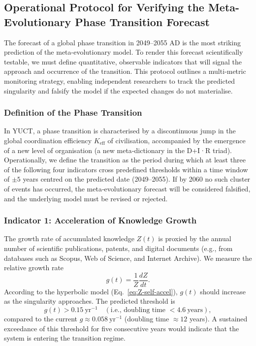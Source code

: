 \documentclass[12pt,a4paper]{article}
\theoremstyle{remark}
\begin{document}
	\subsection{Operational Protocol for Verifying the Meta-Evolutionary Phase Transition Forecast}
	\label{subsec:forecast-protocol}
	
	The forecast of a global phase transition in 2049–2055 AD is the most striking prediction of the meta-evolutionary model. To render this forecast scientifically testable, we must define quantitative, observable indicators that will signal the approach and occurrence of the transition. This protocol outlines a multi‑metric monitoring strategy, enabling independent researchers to track the predicted singularity and falsify the model if the expected changes do not materialise.
	
	\subsubsection{Definition of the Phase Transition}
	
	In YUCT, a phase transition is characterised by a discontinuous jump in the global coordination efficiency \(K_{\text{eff}}\) of civilisation, accompanied by the emergence of a new level of organisation (a new meta‑dictionary in the D+I·R triad). Operationally, we define the transition as the period during which at least three of the following four indicators cross predefined thresholds within a time window of \(\pm 5\) years centred on the predicted date (2049–2055). If by 2060 no such cluster of events has occurred, the meta‑evolutionary forecast will be considered falsified, and the underlying model must be revised or rejected.
	
	\subsubsection{Indicator 1: Acceleration of Knowledge Growth}
	
	The growth rate of accumulated knowledge \(Z(t)\) is proxied by the annual number of scientific publications, patents, and digital documents (e.g., from databases such as Scopus, Web of Science, and Internet Archive). We measure the relative growth rate
	\[
	g(t) = \frac{1}{Z}\frac{dZ}{dt}.
	\]
	According to the hyperbolic model (Eq.~\ref{eq:Z-self-accel}), \(g(t)\) should increase as the singularity approaches. The predicted threshold is
	\[
	g(t) > 0.15\ \text{yr}^{-1} \quad (\text{i.e., doubling time } < 4.6\ \text{years}),
	\]
	compared to the current \(g\approx 0.058\ \text{yr}^{-1}\) (doubling time \(\approx 12\) years). A sustained exceedance of this threshold for five consecutive years would indicate that the system is entering the transition regime.
	
\end{document}
